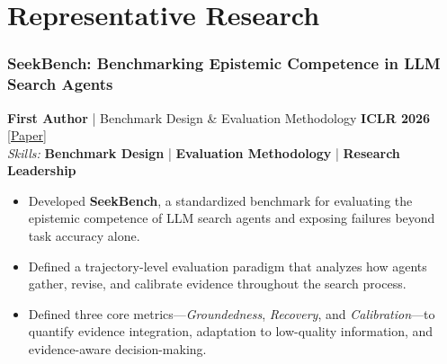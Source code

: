 \documentclass[10pt,a4paper]{article}
\begin{document}
\section*{\color{sectioncolor}Representative Research}

    \subsubsection*{\color{itemcolor}SeekBench: Benchmarking Epistemic Competence in LLM Search Agents}
    \noindent\textbf{\color{sectioncolor}First Author} | Benchmark Design \& Evaluation Methodology \hfill \color{accentcolor}\textbf{ICLR 2026} \\
    \noindent\href{https://arxiv.org/abs/2509.22391}{\color{linkcolor}[Paper]} \\
    \noindent\textit{\color{graytext}Skills:} \textbf{Benchmark Design} | \textbf{Evaluation Methodology} | \textbf{Research Leadership}
    \begin{itemize}[leftmargin=*, label=\textcolor{accentcolor}{\textbullet}, itemsep=0.2em]
        \item Developed \textbf{SeekBench}, a standardized benchmark for evaluating the epistemic competence of LLM search agents and exposing failures beyond task accuracy alone.
        \item Defined a trajectory-level evaluation paradigm that analyzes how agents gather, revise, and calibrate evidence throughout the search process.
        \item Defined three core metrics—\textit{Groundedness}, \textit{Recovery}, and \textit{Calibration}—to quantify evidence integration, adaptation to low-quality information, and evidence-aware decision-making.
    \end{itemize}
    \vspace{0.3em}
\end{document}
